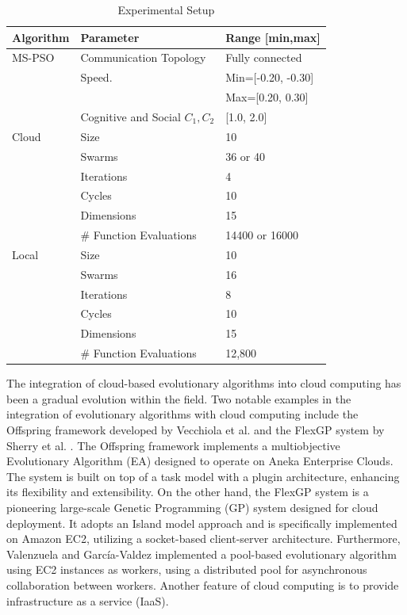 \documentclass{cys}
\begin{document}
\begin{table}[ht]
\centering
\caption{Experimental Setup}\label{tab:alg_params} %
\setlength{\tabcolsep}{10pt}
\begin{tabular}{l l l}
\hline
\textbf{Algorithm} & \textbf{Parameter}	& \textbf{Range [min,max]}\\ \hline
MS-PSO & Communication Topology & Fully connected  \\
& Speed.       & Min=[-0.20, -0.30] \\
&              & Max=[0.20, 0.30]  \\
& Cognitive and Social $C_1,C_2$ &  [1.0, 2.0]  \\ \hline
Cloud       & Size              & 10       \\
            & Swarms            & 36 or 40 \\
            & Iterations        &  4       \\
            & Cycles            & 10       \\
            & Dimensions        & 15       \\   
                   & \# Function Evaluations   & 14400 or 16000\\ \hline
Local       & Size              & 10       \\
            & Swarms            & 16       \\
            & Iterations        &  8       \\
            & Cycles            & 10       \\
            & Dimensions        & 15       \\   
            & \# Function Evaluations   & 12,800   \\ \hline
\end{tabular}
\end{table}

The integration of cloud-based evolutionary algorithms into cloud computing has been a 
gradual evolution within the field. Two notable examples in the integration of evolutionary algorithms with cloud computing 
include the Offspring framework developed by Vecchiola et al. \cite{vecchiola2009multi} 
and the FlexGP system by Sherry et al. \cite{FlexGP}.
The Offspring framework implements a multiobjective Evolutionary Algorithm (EA) 
designed to operate on Aneka Enterprise Clouds. The system is built on top of a task 
model with a plugin architecture, enhancing its flexibility and extensibility.
On the other hand, the FlexGP system is a pioneering large-scale Genetic Programming (GP) system
designed for cloud deployment. It adopts an Island model approach and is specifically 
implemented on Amazon EC2, utilizing a socket-based client-server architecture. Furthermore, 
Valenzuela and García-Valdez \cite{valenzuela2015implementing} implemented a pool-based evolutionary 
algorithm using EC2 instances as workers, using a distributed pool for asynchronous collaboration 
between workers. Another feature of cloud computing is to provide infrastructure as a service (IaaS). 
\end{document}

